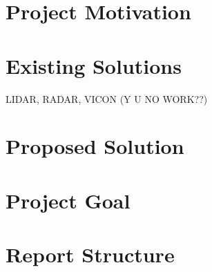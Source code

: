 \section{Project Motivation}

\section{Existing Solutions}

LIDAR, RADAR, VICON (Y U NO WORK??)

\section{Proposed Solution}

\section{Project Goal}

\section{Report Structure}
